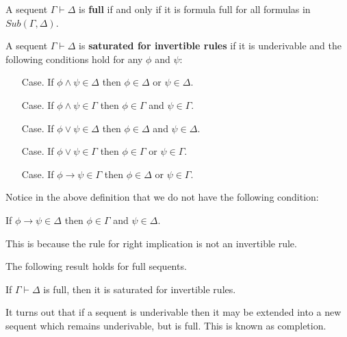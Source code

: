 \documentclass{article}
\begin{document}
\begin{definition}
  \label{def:full_sequent}
  A sequent $\Gamma \vdash \Delta$ is \textbf{full} if and only if it is formula full for all formulas in 
  $Sub(\Gamma,\Delta)$.
\end{definition}

\begin{definition}
  \label{def:sat_for_invert_rules}
  A sequent $\Gamma \vdash \Delta$ is \textbf{saturated for invertible rules} if it is
  underivable and the following conditions hold for any $\phi$ and $\psi$:
    \begin{itemize}
    \item[Case.] If $\phi \land \psi \in \Delta$ then $\phi \in \Delta$ or $\psi \in \Delta$.
    \item[Case.] If $\phi \land \psi \in \Gamma$ then $\phi \in \Gamma$ and $\psi \in \Gamma$.
    \item[Case.] If $\phi \lor \psi \in \Delta$ then $\phi \in \Delta$ and $\psi \in \Delta$.
    \item[Case.] If $\phi \lor \psi \in \Gamma$ then $\phi \in \Gamma$ or $\psi \in \Gamma$.      
    \item[Case.] If $\phi \to \psi \in \Gamma$ then $\phi \in \Delta$ or $\psi \in \Gamma$.      
    \end{itemize}    
\end{definition}
\noindent
Notice in the above definition that we do not have the following condition:
\begin{center}
  If $\phi \to \psi \in \Delta$ then $\phi \in \Gamma$ and $\psi \in \Delta$.      
\end{center}
This is because the rule for right implication is not an invertible rule.  

\noindent
The following result holds for full sequents.
\begin{lemma}[Saturation]
  \label{lemma:saturation}
  If $\Gamma \vdash \Delta$ is full, then it is saturated for invertible rules.
\end{lemma}

It turns out that if a sequent is underivable then it may be extended into a new sequent
which remains underivable, but is full.  This is known as completion. 
\end{document}
